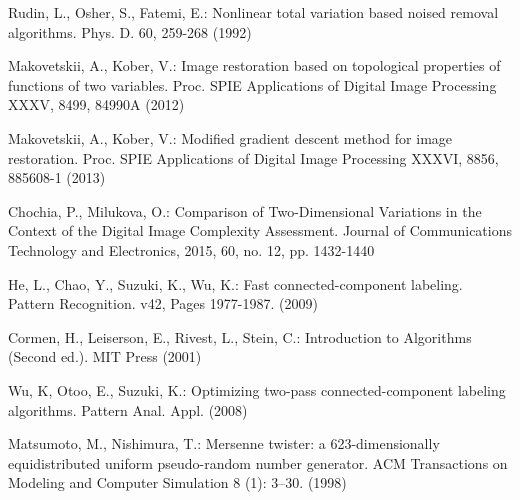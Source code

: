 \documentclass[hidelinks]{llncs}
\begin{document}
\begin{thebibliography}{5}

Rudin, L., Osher, S., Fatemi, E.:
Nonlinear total variation based noised removal algorithms.
Phys. D. 60, 259-268 (1992)


Makovetskii, A., Kober, V.:
Image restoration based on topological properties of functions of two variables.
Proc. SPIE Applications of Digital Image Processing XXXV, 8499, 84990A (2012)

Makovetskii, A., Kober, V.:
Modified gradient descent method for image restoration.
Proc. SPIE Applications of Digital Image Processing XXXVI, 8856, 885608-1 (2013)

Chochia, P., Milukova, O.:
Comparison of Two-Dimensional Variations in the Context of the Digital Image
Complexity Assessment.
Journal of Communications Technology and Electronics, 2015, 60, no. 12,  pp. 1432-1440

He, L., Chao, Y., Suzuki, K., Wu, K.:
Fast connected-component labeling.
Pattern Recognition. v42, Pages 1977-1987. (2009)


Cormen, H., Leiserson, E., Rivest, L., Stein, C.:
Introduction to Algorithms (Second ed.).
MIT Press (2001)

Wu, K, Otoo, E., Suzuki, K.:
Optimizing two-pass connected-component labeling algorithms.
Pattern Anal. Appl. (2008)


Matsumoto, M., Nishimura, T.:
Mersenne twister: a 623-dimensionally equidistributed uniform pseudo-random
number generator.
ACM Transactions on Modeling and Computer Simulation 8 (1): 3–30. (1998)

\end{thebibliography}
\end{document}
